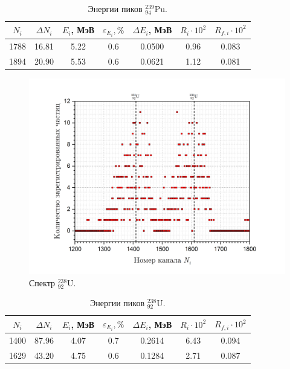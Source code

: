 \documentclass[a4paper, 12pt]{article}
\newcommand{\elem}[3]{{}^{#2}_{#3}\text{#1}}
\newcommand{\Pu}{\elem{Pu}{239}{94}}
\newcommand{\Ua}{\elem{U}{238}{92}}
\begin{document}
    \begin{table}[H]
        \centering
        \addtolength{\tabcolsep}{-4pt}
        \footnotesize
        \begin{tabular}{ccccccc}
            \toprule
            $N_i$ & $\Delta N_i$ & $E_i$, МэВ & $\varepsilon_{E_i}, \%$ & $\Delta E_i$, МэВ & $R_i \cdot 10^2$ & $R_{f,i} \cdot 10^2$ \\
            \midrule
            1788 & 16.81 & 5.22 & 0.6 & 0.0500 & 0.96 & 0.083 \\
            1894 & 20.90 & 5.53 & 0.6 & 0.0621 & 1.12 & 0.081 \\
            \bottomrule
        \end{tabular}
        \caption{Энергии пиков $\Pu$.}
        \label{tab:pu}
    \end{table}
	
    \begin{figure}[H]
        \centering
        \includegraphics[width = 12 cm]{images/graph_u.png}
        \caption{Спектр $\Ua$.}
        \label{fig:u}
    \end{figure}
    
    \begin{table}[H]
        \centering
        \addtolength{\tabcolsep}{-4pt}
        \footnotesize
        \begin{tabular}{ccccccc}
            \toprule
            $N_i$ & $\Delta N_i$ & $E_i$, МэВ & $\varepsilon_{E_i}, \%$ & $\Delta E_i$, МэВ & $R_i \cdot 10^2$ & $R_{f,i} \cdot 10^2$ \\
            \midrule
            1400 & 87.96 & 4.07 & 0.7 & 0.2614 & 6.43 & 0.094 \\
            1629 & 43.20 & 4.75 & 0.6 & 0.1284 & 2.71 & 0.087 \\
            \bottomrule
        \end{tabular}
        \caption{Энергии пиков $\Ua$.}
        \label{tab:u}
    \end{table}
	
\end{document}
